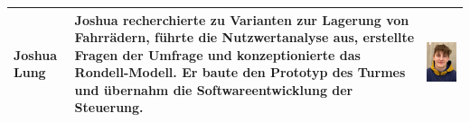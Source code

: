 \begin{table}[H]
\begin{tabular}{lp{}c}
    \midrule
    Joshua Lung    & Joshua recherchierte zu Varianten zur Lagerung von Fahrrädern, führte die Nutzwertanalyse aus, erstellte Fragen der Umfrage und konzeptionierte das Rondell-Modell. Er baute den Prototyp des Turmes und übernahm die Softwareentwicklung der Steuerung. & \begin{minipage}{.2\textwidth}\centering\includegraphics[width=\textwidth]{images/joshualung.jpg}\end{minipage} \\
    \midrule

\end{tabular}
\end{table}
